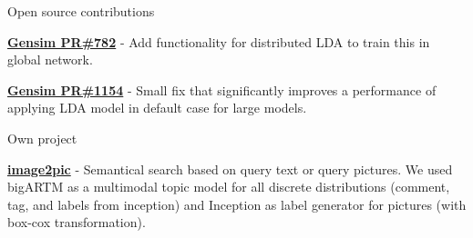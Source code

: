 


\begin{cventries}


\cventry
{} %
{Open source contributions} %
{} %
{} %
{ %
\begin{cvitems}
\item {\href{https://github.com/RaRe-Technologies/gensim/pull/782}{\textbf{Gensim PR\#782}} - Add functionality for distributed LDA to train this in global network.}
\item {\href{https://github.com/RaRe-Technologies/gensim/pull/1154}{\textbf{Gensim PR\#1154}}  - Small fix that significantly improves a performance of applying LDA model in default case for large models.}
\end{cvitems}
}


\cventry
{} %
{Own project} %
{} %
{} %
{ %
\begin{cvitems}
\item {\href{https://github.com/menshikh-iv/image2pic}{\textbf{image2pic}} - Semantical search based on query text or query pictures. We used bigARTM as a multimodal topic model for all discrete distributions (comment, tag, and labels from inception) and Inception as label generator for pictures (with box-cox transformation).}
\end{cvitems}
}

\end{cventries}